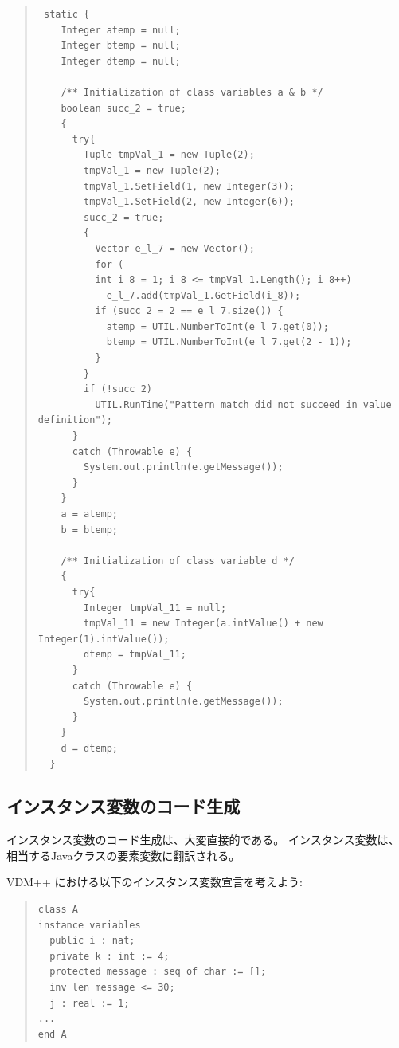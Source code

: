 \documentclass[\pformat,11pt]{jarticle}
\newcommand{\VDM}{VDM++}
\begin{document}
\begin{quote}
\begin{small}
\begin{verbatim}
 static {
    Integer atemp = null;
    Integer btemp = null;
    Integer dtemp = null;

    /** Initialization of class variables a & b */
    boolean succ_2 = true;
    {
      try{
        Tuple tmpVal_1 = new Tuple(2);
        tmpVal_1 = new Tuple(2);
        tmpVal_1.SetField(1, new Integer(3));
        tmpVal_1.SetField(2, new Integer(6));
        succ_2 = true;
        {
          Vector e_l_7 = new Vector();
          for (
          int i_8 = 1; i_8 <= tmpVal_1.Length(); i_8++)
            e_l_7.add(tmpVal_1.GetField(i_8));
          if (succ_2 = 2 == e_l_7.size()) {
            atemp = UTIL.NumberToInt(e_l_7.get(0));
            btemp = UTIL.NumberToInt(e_l_7.get(2 - 1));
          }
        }
        if (!succ_2)
          UTIL.RunTime("Pattern match did not succeed in value definition");
      }
      catch (Throwable e) {
        System.out.println(e.getMessage());
      }
    }
    a = atemp;
    b = btemp;

    /** Initialization of class variable d */
    {
      try{
        Integer tmpVal_11 = null;
        tmpVal_11 = new Integer(a.intValue() + new Integer(1).intValue());
        dtemp = tmpVal_11;
      }
      catch (Throwable e) {
        System.out.println(e.getMessage());
      }
    }
    d = dtemp;
  }
\end{verbatim}
\end{small}
\end{quote}


\subsection{インスタンス変数のコード生成}
\label{sec:instvars}

インスタンス変数のコード生成は、大変直接的である。
インスタンス変数は、相当するJavaクラスの要素変数に翻訳される。

 \VDM{} における以下のインスタンス変数宣言を考えよう:

\begin{quote}
\begin{verbatim}
class A
instance variables
  public i : nat;
  private k : int := 4;
  protected message : seq of char := [];
  inv len message <= 30;
  j : real := 1;
...
end A
\end{verbatim}
\end{quote}
\end{document}
